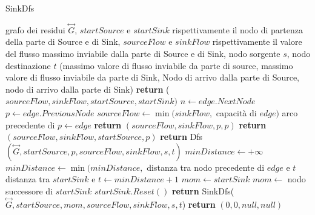 \documentclass{article}
\begin{document}
\begin{algorithm}
\caption{SinkDfs}
\begin{algorithmic}
\REQUIRE grafo dei residui $\overset{\leftrightarrow}{G}$, $startSource$ e $startSink$ rispettivamente il nodo di partenza della parte di Source e di Sink, $sourceFlow$ e $sinkFlow$ rispettivamente il valore del flusso massimo inviabile dalla parte di Source e di Sink, nodo sorgente $s$, nodo destinazione $t$
\ENSURE (massimo valore di flusso inviabile da parte di source, massimo valore di flusso inviabile da parte di Sink, Nodo di arrivo dalla parte di Source, nodo di arrivo dalla parte di Sink)
\STATE \textbf{return} ($sourceFlow,sinkFlow,startSource,startSink)$ 
\ENDIF
{}
\STATE $n \leftarrow edge.NextNode$
\STATE $p \leftarrow edge.PreviousNode$
\STATE $sourceFlow \leftarrow \min(sinkFlow,$ capacità di $edge)$
\STATE arco precedente di $ p \leftarrow edge$ 
\STATE \textbf{return}  $(sourceFlow, sinkFlow,p,p)$
\ENDIF
{}
\STATE \textbf{return} $(sourceFlow,sinkFlow,startSource,p)$
\ENDIF
\STATE \textbf{return} Dfs$(\overset{\leftrightarrow}{G},startSource, p, sourceFlow, sinkFlow,s,t)$
\ENDIF
\ENDFOR
\STATE $minDistance \leftarrow +\infty$
\STATE $minDistance \leftarrow \min(minDistance,$ distanza tra nodo precedente di $edge$ e $t$
\ENDIF
\ENDFOR
\STATE distanza tra $startSink$ e $t \leftarrow minDistance+1$
\STATE $mom \leftarrow startSink$
\ELSE
\STATE $mom \leftarrow $ nodo successore di $startSink$ 
\ENDIF
\STATE $startSink.Reset()$
\STATE \textbf{return} SinkDfs($\overset{\leftrightarrow}{G},startSource, mom, sourceFlow, sinkFlow,s,t$)
\ENDIF 
\STATE \textbf{return} $(0,0,null,null)$

\end{algorithmic}
\end{algorithm}
\end{document}

